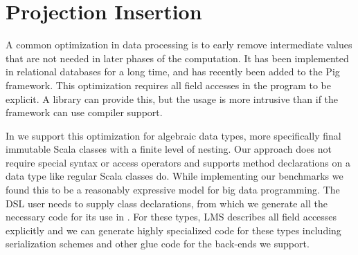 \section{Projection Insertion}
\label{sec:field-reduction}

A common optimization in data processing is to early remove intermediate values that are not needed in later phases of the computation. It has been implemented in relational databases for a long time, and has recently been added to the Pig framework. This optimization requires all field accesses in the program to be explicit. A library can provide this, but the usage is more intrusive than if the framework can use compiler support. 

In \tool we support this optimization for algebraic data types, more specifically final immutable Scala classes with a finite level of nesting. Our approach does not require special syntax or access operators and supports method declarations on a data type like regular Scala classes do. While implementing our benchmarks we found this to be a reasonably expressive model for big data programming. The DSL user needs to supply class declarations, from which we generate all the necessary code for its use in \tool. For these types, LMS describes all field accesses explicitly and we can generate highly specialized code for these types including serialization schemes and other glue code for the back-ends we support.



